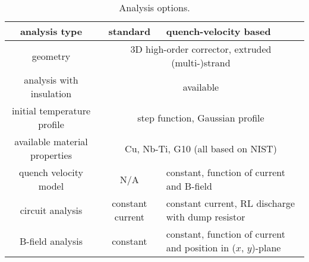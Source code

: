 \begin{table}[H]
    \caption{Analysis options.} 
    \vspace{-1.em} 
    \fontsize{10}{10}
    \selectfont 
    \renewcommand{\arraystretch}{1.5}
    \begin{center}
        \begin{tabular}{ c | c | m{5cm} }  
        \hline
        \textbf{analysis type} & \textbf{standard} & \textbf{quench-velocity based} \\
        \hline
        geometry & \multicolumn{2}{c}{3D high-order corrector,  extruded (multi-)strand} \\
        \hline
        analysis with insulation & \multicolumn{2}{c}{available} \\
        \hline
        initial temperature profile & \multicolumn{2}{c}{step function, Gaussian profile} \\
        \hline
        available material properties & \multicolumn{2}{c}{Cu, Nb-Ti, G10 (all based on NIST)} \\
        \hline
        quench velocity model & N/A & constant, function of current and B-field \\
        \hline
        circuit analysis & constant current & constant current, RL discharge with dump resistor \\ 
        \hline
        B-field analysis & constant & constant, function of current and position in ($x$, $y$)-plane
        \end{tabular}
    \end{center}  
     \label{table:python_analysis_options} 
 \end{table}
